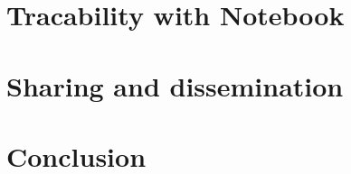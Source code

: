 \documentclass{beamer}
\begin{document}
\section{Tracability with Notebook}

\label{Sharing}
\section{Sharing and dissemination}

\label{Conclusion}
\section{Conclusion}

\end{document}
